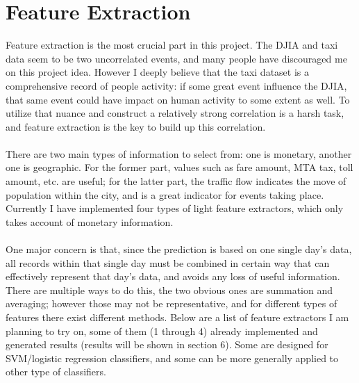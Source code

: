 \documentclass[a4paper]{article}
\begin{document}
\section{Feature Extraction}
Feature extraction is the most crucial part in this project. The DJIA and taxi data seem to be two uncorrelated events, and many people have discouraged me on this project idea. However I deeply believe that the taxi dataset is a comprehensive record of people activity: if some great event influence the DJIA, that same event could have impact on human activity to some extent as well. To utilize that nuance and construct a relatively strong correlation is a harsh task, and feature extraction is the key to build up this correlation. \\\\          There are two main types of information to select from: one is monetary, another one is geographic. For the former part, values such as fare amount, MTA tax, toll amount, etc. are useful; for the latter part, the traffic flow indicates the move of population within the city, and is a great indicator for events taking place. Currently I have implemented four types of light feature extractors, which only takes account of monetary information. \\\\
One major concern is that, since the prediction is based on one single day's data, all records within that single day must be combined in certain way that can effectively represent that day's data, and avoids any loss of useful information. There are multiple ways to do this, the two obvious ones are summation and averaging; however those may not be representative, and for different types of features there exist different methods. Below are a list of feature extractors I am planning to try on, some of them (1 through 4) already implemented and generated results (results will be shown in section 6). Some are designed for SVM/logistic regression classifiers, and some can be more generally applied to other type of classifiers. 
\end{document}
